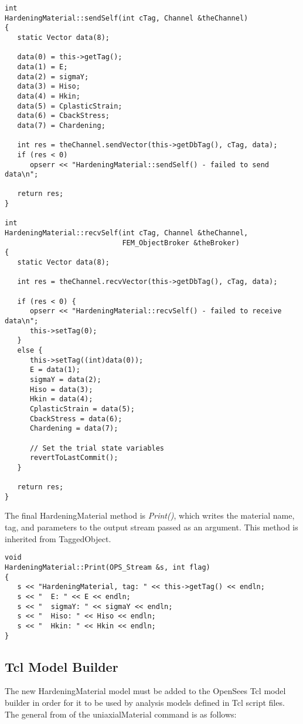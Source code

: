 \documentclass[12pt]{article}
\begin{document}
{\sf\small
\begin{verbatim}
int 
HardeningMaterial::sendSelf(int cTag, Channel &theChannel)
{
   static Vector data(8);
  
   data(0) = this->getTag();
   data(1) = E;
   data(2) = sigmaY;
   data(3) = Hiso;
   data(4) = Hkin;
   data(5) = CplasticStrain;
   data(6) = CbackStress;
   data(7) = Chardening;
  
   int res = theChannel.sendVector(this->getDbTag(), cTag, data);
   if (res < 0) 
      opserr << "HardeningMaterial::sendSelf() - failed to send data\n";

   return res;
}

int 
HardeningMaterial::recvSelf(int cTag, Channel &theChannel, 
                            FEM_ObjectBroker &theBroker)
{
   static Vector data(8);
   
   int res = theChannel.recvVector(this->getDbTag(), cTag, data);
  
   if (res < 0) {
      opserr << "HardeningMaterial::recvSelf() - failed to receive data\n";
      this->setTag(0);      
   }
   else {
      this->setTag((int)data(0));
      E = data(1);
      sigmaY = data(2);
      Hiso = data(3);
      Hkin = data(4);
      CplasticStrain = data(5);
      CbackStress = data(6);
      Chardening = data(7);

      // Set the trial state variables
      revertToLastCommit();
   }
    
   return res;
}
\end{verbatim}
}

\noindent The final HardeningMaterial method is {\em Print()}, which writes the material
name, tag, and parameters to the output stream passed as an argument. This method is
inherited from TaggedObject.

{\sf\small
\begin{verbatim}
void 
HardeningMaterial::Print(OPS_Stream &s, int flag)
{
   s << "HardeningMaterial, tag: " << this->getTag() << endln;
   s << "  E: " << E << endln;
   s << "  sigmaY: " << sigmaY << endln;
   s << "  Hiso: " << Hiso << endln;
   s << "  Hkin: " << Hkin << endln;
}
\end{verbatim}
}

\subsection{Tcl Model Builder}
The new HardeningMaterial model must be added to the OpenSees Tcl model builder in
order for it to be used by analysis models defined in Tcl script files. The general
from of the uniaxialMaterial command is as follows:
\end{document}
